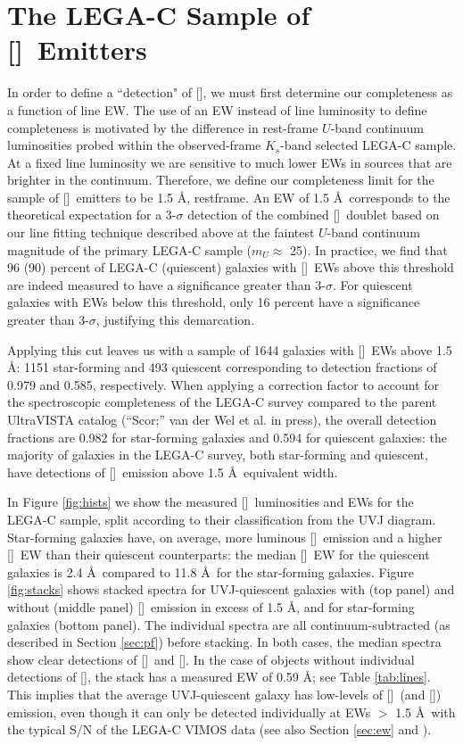 \documentclass[twocolumn,natbib,iop,hyperref]{aastex62}
\newcommand{\oiii}{[\ion{O}{3}]}
\newcommand{\oii}{[\ion{O}{2}]}
\begin{document}
\section{The LEGA-C Sample of \oii\ Emitters}
\label{sec:sample}
In order to define a ``detection" of \oii, we must first determine our completeness as a function of line EW.  The use of an EW instead of line luminosity to define completeness is motivated by the difference in rest-frame $U$-band continuum luminosities probed within the observed-frame $K_s$-band selected LEGA-C sample.  At a fixed line luminosity we are sensitive to much lower EWs in sources that are brighter in the continuum.  Therefore, we define our completeness limit for the sample of \oii\ emitters to be 1.5 \AA, restframe.  An EW of 1.5 \AA\ corresponds to the theoretical expectation for a 3-$\sigma$ detection of the combined \oii\ doublet based on our line fitting technique described above at the faintest $U$-band continuum magnitude of the primary LEGA-C sample ($m_U\approx$ 25).  In practice, we find that 96 (90) percent of LEGA-C (quiescent) galaxies with \oii\ EWs above this threshold are indeed measured to have  a significance greater than 3-$\sigma$.  For quiescent galaxies with EWs below this threshold, only 16 percent have a significance greater than 3-$\sigma$, justifying this demarcation.

Applying this cut leaves us with a sample of 1644 galaxies with \oii\ EWs above 1.5 \AA: 1151 star-forming and 493 quiescent corresponding to detection fractions of 0.979 and 0.585, respectively.  When applying a correction factor to account for the spectroscopic completeness of the LEGA-C survey compared to the parent UltraVISTA catalog (``Scor;'' van der Wel et al. in press), the overall detection fractions are 0.982 for star-forming galaxies and 0.594 for quiescent galaxies: the majority of galaxies in the LEGA-C survey, both star-forming and quiescent, have detections of \oii\ emission above 1.5 \AA\ equivalent width.  

In Figure \ref{fig:hists} we show the measured \oii\ luminosities and EWs for the LEGA-C sample, split according to their classification from the UVJ diagram.  Star-forming galaxies have, on average, more luminous \oii\ emission and a higher \oii\ EW than their quiescent counterparts: the median \oii\ EW for the quiescent galaxies is 2.4 \AA\ compared to 11.8 \AA\ for the star-forming galaxies.  Figure \ref{fig:stacks} shows stacked spectra for UVJ-quiescent galaxies with (top panel) and without (middle panel) \oii\ emission in excess of 1.5 \AA, and for star-forming galaxies (bottom panel).  The individual spectra are all continuum-subtracted (as described in Section \ref{sec:pf}) before stacking.  In both cases, the median spectra show clear detections of \oii\ and \oiii.  In the case of objects without individual detections of \oii, the stack has a measured EW of 0.59 \AA; see Table \ref{tab:lines}.  This implies that the average UVJ-quiescent galaxy has low-levels of \oii\ (and \oiii) emission, even though it can only be detected individually at EWs $>$ 1.5 \AA\ with the typical S/N of the LEGA-C VIMOS data (see also Section \ref{sec:ew} and \citeauthor{2017ApJ...838...94W} \citeyear{2017ApJ...838...94W}).  
\end{document}

